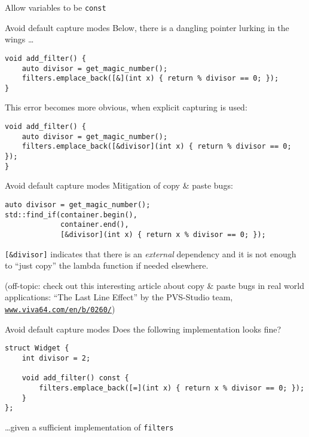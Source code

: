 \begin{frame}[fragile]{Allow variables to be \texttt{const}}
\end{frame}

\begin{frame}[fragile]{Avoid default capture modes}
    Below, there is a dangling pointer lurking in the wings \ldots
    \begin{lstlisting}
void add_filter() {
    auto divisor = get_magic_number();
    filters.emplace_back([&](int x) { return % divisor == 0; });
}
    \end{lstlisting}

    This error becomes more obvious, when explicit capturing is used:
    \begin{lstlisting}
void add_filter() {
    auto divisor = get_magic_number();
    filters.emplace_back([&divisor](int x) { return % divisor == 0; });
}
    \end{lstlisting}
\end{frame}

\begin{frame}[fragile]{Avoid default capture modes}
    Mitigation of copy \& paste bugs:
    \begin{lstlisting}
auto divisor = get_magic_number();
std::find_if(container.begin(),
             container.end(),
             [&divisor](int x) { return x % divisor == 0; });
    \end{lstlisting}

    \texttt{[\&divisor]} indicates that there is an \textit{external} dependency and it is not enough to \enquote{just copy} the lambda function if needed elsewhere.

    {\footnotesize (off-topic: check out this interesting article about copy \& paste bugs in real world applications: \enquote{The Last Line Effect} by the PVS-Studio team, \href{https://www.viva64.com/en/b/0260/}{\texttt{www.viva64.com/en/b/0260/}})}  
\end{frame}

\begin{frame}[fragile]{Avoid default capture modes}
    Does the following implementation looks fine?
    \begin{lstlisting}
struct Widget {
    int divisor = 2;

    void add_filter() const {
        filters.emplace_back([=](int x) { return x % divisor == 0; });
    }
};
    \end{lstlisting}
    \hfill \ldots given a sufficient implementation of \texttt{filters}

\end{frame}

